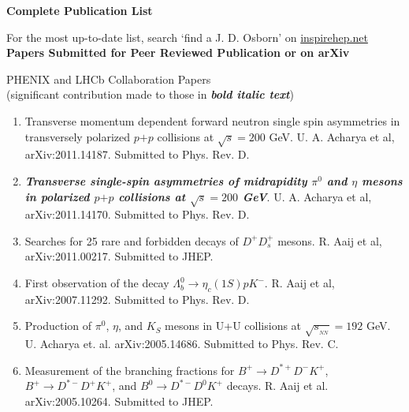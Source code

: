 \documentclass[11pt]{article}
\begin{document}
\begin{flushleft}

\huge\textbf{Complete Publication List}
\vspace{0.5cm}

{\large For the most up-to-date list, search `find a J. D. Osborn' on \href{inspirehep.net}{inspirehep.net} \\}
\vspace{0.5cm}
\Large\textbf{Papers Submitted for Peer Reviewed Publication or on arXiv} \\
\normalsize
\begin{center}
	\begin{flushleft}
	
	\begin{enumerate}
	
	\end{enumerate}
	
	\large PHENIX and LHCb Collaboration Papers\\ (significant contribution made to those in \textbf{\textit{bold italic text}}) \\
	\end{flushleft}
	\begin{enumerate}
			\item Transverse momentum dependent forward neutron single spin asymmetries in transversely polarized $p$$+$$p$ collisions at $\sqrt{s}=200$ GeV. U. A. Acharya et al, arXiv:2011.14187. Submitted to Phys. Rev. D.
			
			\item {\bf{\textit{Transverse single-spin asymmetries of midrapidity $\pi^0$ and $\eta$ mesons in polarized $p$$+$$p$ collisions at $\sqrt{s}=200$ GeV}}}. U. A. Acharya et al, arXiv:2011.14170. Submitted to Phys. Rev. D.
			
		\item Searches for 25 rare and forbidden decays of $D^+D_s^+ $ mesons. R. Aaij et al, arXiv:2011.00217. Submitted to JHEP.

		\item First observation of the decay $\Lambda_b^0 \to \eta_c(1S) p K^-$. R. Aaij et al, arXiv:2007.11292. Submitted to Phys. Rev. D.
	
		\item Production of $\pi^0$, $\eta$, and $K_S$ mesons in U+U collisions at $\sqrt{s_{_{NN}}}=192$ GeV. U. Acharya et. al. arXiv:2005.14686. Submitted to Phys. Rev. C.

		\item Measurement of the branching fractions for $B^+\to D^{*+}D^-K^+$, $B^+\to D^{*-}D^+K^+$, and $B^0\to D^{*-}D^0K^+$ decays. R. Aaij et al. arXiv:2005.10264. Submitted to JHEP.		
		

\end{enumerate}
\end{center}
\end{flushleft}
\end{document}
